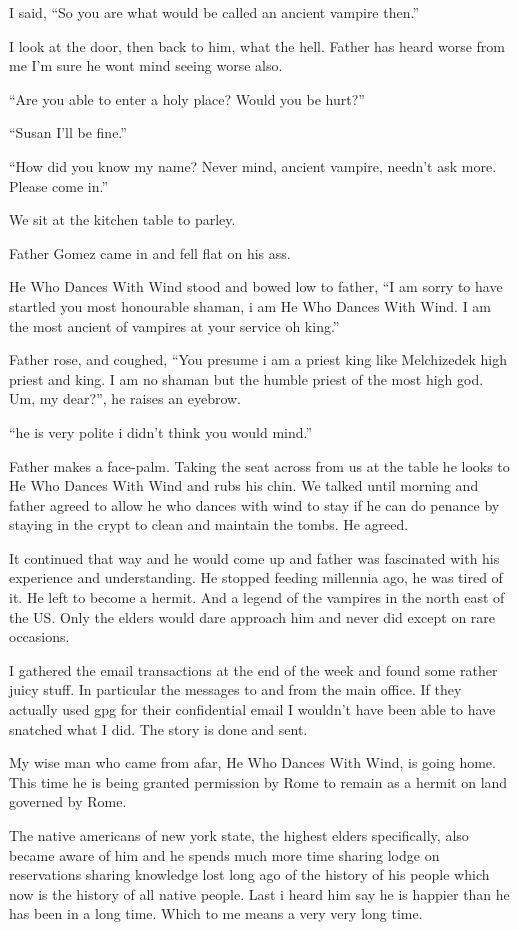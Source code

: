 I said, ``So you are what would be called an ancient vampire then.''

I look at the door, then back to him, what the hell. Father has heard worse from me I'm sure he wont mind seeing worse also.

``Are you able to enter a holy place? Would you be hurt?''

``Susan I'll be fine.''

``How did you know my name? Never mind, ancient vampire, needn't ask more. Please come in.''

We sit at the kitchen table to parley.

Father Gomez came in and fell flat on his ass.

He Who Dances With Wind stood and bowed low to father, ``I am sorry to have startled you most honourable shaman, i am He Who Dances With Wind. I am the most ancient of vampires at your service oh king.''

Father rose, and coughed, ``You presume i am a priest king like Melchizedek high priest and king. I am no shaman but the humble priest of the most high god. Um, my dear?'', he raises an eyebrow.

``he is very polite i didn't think you would mind.''

Father makes a face-palm. Taking the seat across from us at the table he looks to He Who Dances With Wind and rubs his chin.
We talked until morning and father agreed to allow he who dances with wind to stay if he can do penance by staying in the crypt to clean and maintain the tombs. He agreed.

It continued that way and he would come up and father was fascinated with his experience and understanding. He stopped feeding millennia ago, he was tired of it. He left to become a hermit. And a legend of the vampires in the north east of the US. Only the elders would dare approach him and never did except on rare occasions.

I gathered the email transactions at the end of the week and found some rather juicy stuff. In particular the messages to and from the main office. If they actually used gpg for their confidential email I wouldn't have been able to have snatched what I did. The story is done and sent. 

My wise man who came from afar, He Who Dances With Wind, is going home. This time he is being granted permission by Rome to remain as a hermit on land governed by Rome. 

The native americans of new york state, the highest elders specifically, also became aware of him and he spends much more time sharing lodge on reservations sharing knowledge lost long ago of the history of his people which now is the history of all native people. Last i heard him say he is happier than he has been in a long time. Which to me means a very very long time.

